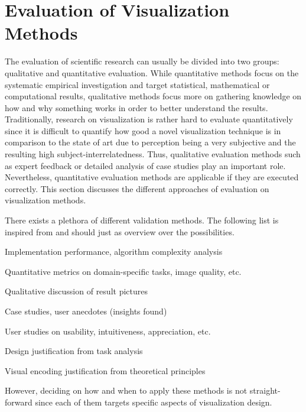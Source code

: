 \section{Evaluation of Visualization Methods}
The evaluation of scientific research can usually be divided into two groups: qualitative and quantitative evaluation.
While quantitative methods focus on the systematic empirical investigation and target  statistical, mathematical or computational results, qualitative methods focus more on gathering knowledge on how and why something works in order to better understand the results.
Traditionally, research on visualization is rather hard to evaluate quantitatively since it is difficult to quantify how good a novel visualization technique is in comparison to the state of art due to perception being a very subjective  and the resulting high subject-interrelatedness.
Thus, qualitative evaluation methods such as expert feedback or detailed analysis of case studies play an important role.
Nevertheless, quantitative evaluation methods are applicable if they are executed correctly.
This section discusses the different approaches of evaluation on visualization methods.

There exists a plethora of different validation methods. The following list is inspired from \cite{Munzner:2008:InfoVis} and should just  as overview over the possibilities.
\begin{my_list_item}
	\item Implementation performance, algorithm complexity analysis
	\item Quantitative metrics on domain-specific tasks, image quality, etc.
	\item Qualitative discussion of result pictures
	\item Case studies, user anecdotes (insights found)
	\item User studies on usability, intuitiveness, appreciation, etc.
	\item Design justification from task analysis
	\item Visual encoding justification from theoretical principles
\end{my_list_item}
However, deciding on how and when to apply these methods is not straight-forward since each of them targets specific aspects of visualization design.

